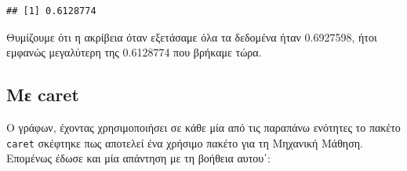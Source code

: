 \documentclass[
]{article}
\newenvironment{Shaded}{\begin{snugshade}}{\end{snugshade}}
\newcommand{\AttributeTok}[1]{\textcolor[rgb]{0.13,0.29,0.53}{#1}}
\newcommand{\CommentTok}[1]{\textcolor[rgb]{0.56,0.35,0.01}{\textit{#1}}}
\newcommand{\ConstantTok}[1]{\textcolor[rgb]{0.56,0.35,0.01}{#1}}
\newcommand{\DecValTok}[1]{\textcolor[rgb]{0.00,0.00,0.81}{#1}}
\newcommand{\FloatTok}[1]{\textcolor[rgb]{0.00,0.00,0.81}{#1}}
\newcommand{\FunctionTok}[1]{\textcolor[rgb]{0.13,0.29,0.53}{\textbf{#1}}}
\newcommand{\NormalTok}[1]{#1}
\newcommand{\OtherTok}[1]{\textcolor[rgb]{0.56,0.35,0.01}{#1}}
\newcommand{\SpecialCharTok}[1]{\textcolor[rgb]{0.81,0.36,0.00}{\textbf{#1}}}
\newcommand{\StringTok}[1]{\textcolor[rgb]{0.31,0.60,0.02}{#1}}
\begin{document}
\begin{verbatim}
## [1] 0.6128774
\end{verbatim}

Θυμίζουμε ότι η ακρίβεια όταν εξετάσαμε όλα τα δεδομένα ήταν 0.6927598,
ήτοι εμφανώς μεγαλύτερη της 0.6128774 που βρήκαμε τώρα.

\subsection{Με caret}\label{ux3bcux3b5-caret}

Ο γράφων, έχοντας χρησιμοποιήσει σε κάθε μία από τις παραπάνω ενότητες
το πακέτο \texttt{caret} σκέφτηκε πως αποτελεί ένα χρήσιμο πακέτο για τη
Μηχανική Μάθηση. Επομένως έδωσε και μία απάντηση με τη βοήθεια αυτου΄:

\begin{Shaded}
\end{Shaded}
\end{document}

